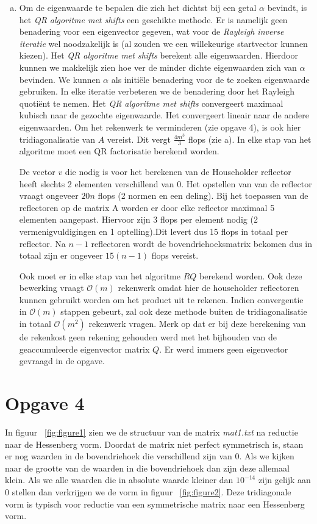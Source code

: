 \documentclass[a4paper]{article}
\newcommand{\opgave}[1]{\section*{Opgave #1}}
\begin{document}
\begin{enumerate}[a)]
\item
Om de eigenwaarde te bepalen die zich het dichtst bij een getal $\alpha$ bevindt, is het \textit{QR algoritme met shifts} een geschikte methode. Er is namelijk geen benadering voor een eigenvector gegeven, wat voor de \textit{Rayleigh inverse iteratie} wel noodzakelijk is (al zouden we een willekeurige startvector kunnen kiezen). Het \textit{QR algoritme met shifts} berekent alle eigenwaarden. Hierdoor kunnen we makkelijk zien hoe ver de minder dichte eigenwaarden zich van $\alpha$ bevinden. We kunnen $\alpha$ als initi\"ele benadering voor de te zoeken eigenwaarde gebruiken. In elke iteratie verbeteren we de benadering door het Rayleigh quoti\"ent te nemen. Het \textit{QR algoritme met shifts} convergeert maximaal kubisch naar de gezochte eigenwaarde. Het convergeert lineair naar de andere eigenwaarden. Om het rekenwerk te verminderen (zie opgave 4), is ook hier tridiagonalisatie van $A$ vereist. Dit vergt  $\frac{4m^{3}}{3}$ flops (zie a). In elke stap van het algoritme moet een QR factorisatie berekend worden.

De vector $v$ die nodig is voor het berekenen van de Householder reflector heeft slechts 2 elementen verschillend van 0. Het opstellen van van de reflector vraagt ongeveer $20n$ flops (2 normen en een deling). Bij het toepassen van de reflectoren op de matrix A worden er door elke reflector maximaal 5 elementen aangepast. Hiervoor zijn 3 flops per element nodig (2 vermenigvuldigingen en 1 optelling).Dit levert dus 15 flops in totaal per reflector. Na $n-1$ reflectoren wordt de bovendriehoeksmatrix bekomen dus in totaal zijn er ongeveer $15(n-1)$ flops vereist. 

Ook moet er in elke stap van het algoritme $RQ$ berekend worden. Ook deze bewerking vraagt $\mathcal{O}(m)$ rekenwerk omdat hier de householder reflectoren kunnen gebruikt worden om het product uit te rekenen. Indien convergentie in $\mathcal{O}(m)$ stappen gebeurt, zal ook deze methode buiten de tridiagonalisatie in totaal $\mathcal{O} (m^2)$ rekenwerk vragen. Merk op dat er bij deze berekening van de rekenkost geen rekening gehouden werd met het bijhouden van de geaccumuleerde eigenvector matrix $Q$. Er werd immers geen eigenvector gevraagd in de opgave.
\end{enumerate}
\opgave{4}
In figuur ~\ref{fig:figure1} zien we de structuur van de matrix \textit{mat1.txt} na reductie naar de Hessenberg vorm. Doordat de matrix niet perfect symmetrisch is, staan er nog waarden in de bovendriehoek die verschillend zijn van 0. Als we kijken naar de grootte van de waarden in die bovendriehoek dan zijn deze allemaal klein. Als we alle waarden die in absolute waarde kleiner dan $10^{-14}$ zijn gelijk aan 0 stellen dan verkrijgen we de vorm in figuur ~\ref{fig:figure2}. Deze tridiagonale vorm is typisch voor reductie van een symmetrische matrix naar een Hessenberg vorm.
\end{document}
